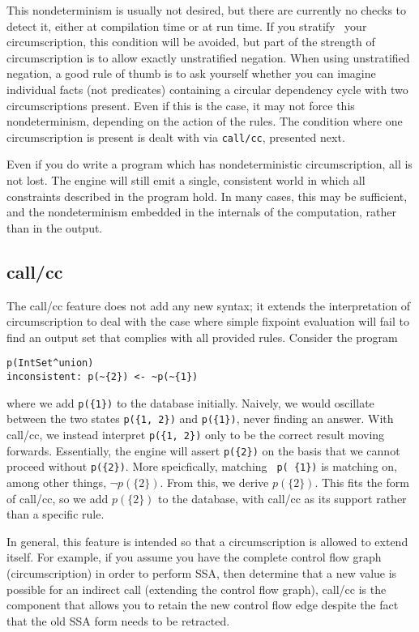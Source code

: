 This nondeterminism is usually not desired, but there are currently no checks to detect it, either at compilation time or at run time.
If you stratify~\cite{prologbook} your circumscription, this condition will be avoided, but part of the strength of circumscription is to allow exactly unstratified negation.
When using unstratified negation, a good rule of thumb is to ask yourself whether you can imagine individual facts (not predicates) containing a circular dependency cycle with two circumscriptions present.
Even if this is the case, it may not force this nondeterminism, depending on the action of the rules.
The condition where one circumscription is present is dealt with via \texttt{call/cc}, presented next.

Even if you do write a program which has nondeterministic circumscription, all is not lost.
The engine will still emit a single, consistent world in which all constraints described in the program hold.
In many cases, this may be sufficient, and the nondeterminism embedded in the internals of the computation, rather than in the output.

\subsection{call/cc}
The call/cc feature does not add any new syntax; it extends the interpretation of circumscription to deal with the case where simple fixpoint evaluation will fail to find an output set that complies with all provided rules.
Consider the program
\begin{verbatim}
p(IntSet^union)
inconsistent: p(~{2}) <- ~p(~{1})
\end{verbatim}
where we add \texttt{p(\{1\})} to the database initially.
Naively, we would oscillate between the two states \texttt{p(\{1, 2\})} and \texttt{p(\{1\})}, never finding an answer.
With call/cc, we instead interpret \texttt{p(\{1, 2\})} only to be the correct result moving forwards.
Essentially, the engine will assert \texttt{p(\{2\})} on the basis that we cannot proceed without \texttt{p(\{2\})}.
More speicfically, matching \texttt{~p(~\{1\})} is matching on, among other things, $\neg p(\{2\})$.
From this, we derive $p(\{2\})$.
This fits the form of call/cc, so we add $p(\{2\})$ to the database, with call/cc as its support rather than a specific rule.

In general, this feature is intended so that a circumscription is allowed to extend itself.
For example, if you assume you have the complete control flow graph (circumscription) in order to perform SSA, then determine that a new value is possible for an indirect call (extending the control flow graph), call/cc is the component that allows you to retain the new control flow edge despite the fact that the old SSA form needs to be retracted.
